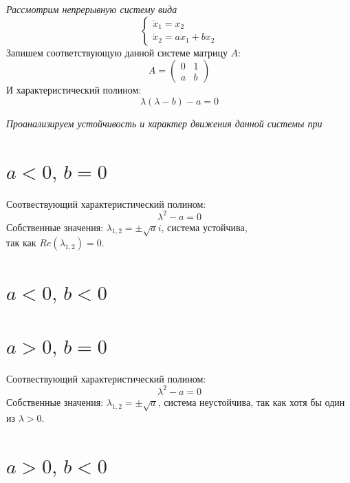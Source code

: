 \documentclass[a5paper, 10pt]{article}
\theoremstyle{definition}
\theoremstyle{plain}
\theoremstyle{remark}
\begin{document}
\textit{Рассмотрим непрерывную систему вида}
\begin{equation}
\begin{cases}
 \dot{x}_1 = x_2  \\
\dot{x}_2 = ax_1 + bx_2
\end{cases}
\end{equation}
Запишем соответствующую данной системе матрицу $A$:
\begin{equation}
A =
\begin{pmatrix}
 0 &  1  \\
a & b
\end{pmatrix}
\end{equation}
И характеристический полином:
\begin{equation}
\lambda \left( \lambda - b \right) - a = 0
\end{equation}

\textit{Проанализируем устойчивость и характер движения данной системы при}

\section{ $a< 0, \, b = 0$}
Соотвествующий характеристический полином:
\begin{equation}
\lambda^2 - a = 0
\end{equation}
Собственные значения: $\lambda_{1,2} = \pm \sqrt{a} i$, система устойчива, \\так как $Re (\lambda_{1,2} )= 0$.


\section{ $a < 0, \, b < 0$}


\section{ $a> 0, \, b = 0$}
Соотвествующий характеристический полином:
\begin{equation}
\lambda^2 - a = 0
\end{equation}
Собственные значения: $\lambda_{1,2} = \pm \sqrt{a}$, система неустойчива, так как хотя бы один из $\lambda > 0$.

\section{ $a> 0, \, b < 0$}
\end{document}
